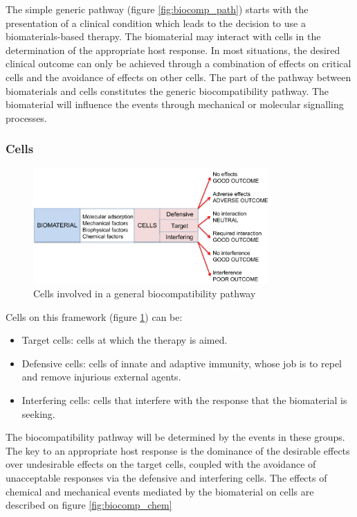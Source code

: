 	The simple generic pathway (figure \ref{fig:biocomp_path}) starts with the presentation of a clinical condition which leads to the decision to use a biomaterials-based therapy.
	The biomaterial may interact with cells in the determination of the appropriate host response.
	In most situations, the desired clinical outcome can only be achieved through a combination of effects on critical cells and the avoidance of effects on other cells.
	The part of the pathway between biomaterials and cells constitutes the generic biocompatibility pathway.
	The biomaterial will influence the events through mechanical or molecular signalling processes.

		\subsubsection{Cells}

		\begin{figure}[ht]
			\centering
			\includegraphics[width=0.8\textwidth]{biocomp_cells.png}
			\caption{Cells involved in a general biocompatibility pathway}
			\label{fig:biocomp_cells}
		\end{figure}

		Cells on this framework (figure \ref{fig:biocomp_cells}) can be:

		\begin{multicols}{2}
			\begin{itemize}
				\item Target cells: cells at which the therapy is aimed.
				\item Defensive cells: cells of innate and adaptive immunity, whose job is to repel and remove injurious external agents.
				\item Interfering cells: cells that interfere with the response that the biomaterial is seeking.
			\end{itemize}
		\end{multicols}

		The biocompatibility pathway will be determined by the events in these groups.
		The key to an appropriate host response is the dominance of the desirable effects over undesirable effects on the target cells, coupled with the avoidance of unacceptable responses via the defensive and interfering cells.
		The effects of chemical and mechanical events mediated by the biomaterial on cells are described on figure \ref{fig:biocomp_chem}


